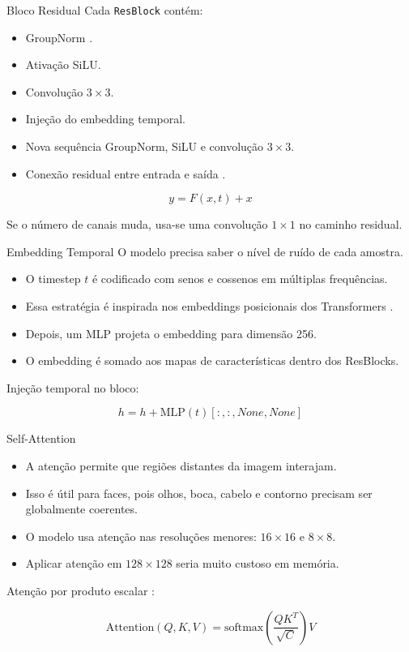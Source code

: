 \documentclass[aspectratio=169]{beamer}
\begin{document}
\begin{frame}{Bloco Residual}
    Cada \texttt{ResBlock} contém:

    \begin{itemize}
        \item GroupNorm \cite{wu2018groupnorm}.
        \item Ativação SiLU.
        \item Convolução $3 \times 3$.
        \item Injeção do embedding temporal.
        \item Nova sequência GroupNorm, SiLU e convolução $3 \times 3$.
        \item Conexão residual entre entrada e saída \cite{he2016resnet}.
    \end{itemize}

    \[
        y = F(x, t) + x
    \]

    Se o número de canais muda, usa-se uma convolução $1 \times 1$ no caminho residual.
\end{frame}

\begin{frame}{Embedding Temporal}
    O modelo precisa saber o nível de ruído de cada amostra.

    \begin{itemize}
        \item O timestep $t$ é codificado com senos e cossenos em múltiplas frequências.
        \item Essa estratégia é inspirada nos embeddings posicionais dos Transformers \cite{vaswani2017attention}.
        \item Depois, um MLP projeta o embedding para dimensão 256.
        \item O embedding é somado aos mapas de características dentro dos ResBlocks.
    \end{itemize}

    Injeção temporal no bloco:

    \[
        h = h + \text{MLP}(t)[:, :, None, None]
    \]
\end{frame}

\begin{frame}{Self-Attention}
    \begin{itemize}
        \item A atenção permite que regiões distantes da imagem interajam.
        \item Isso é útil para faces, pois olhos, boca, cabelo e contorno precisam ser globalmente coerentes.
        \item O modelo usa atenção nas resoluções menores: $16 \times 16$ e $8 \times 8$.
        \item Aplicar atenção em $128 \times 128$ seria muito custoso em memória.
    \end{itemize}

    Atenção por produto escalar \cite{vaswani2017attention}:

    \[
        \text{Attention}(Q, K, V) = \text{softmax}\left(\frac{QK^T}{\sqrt{C}}\right)V
    \]
\end{frame}
\end{document}
